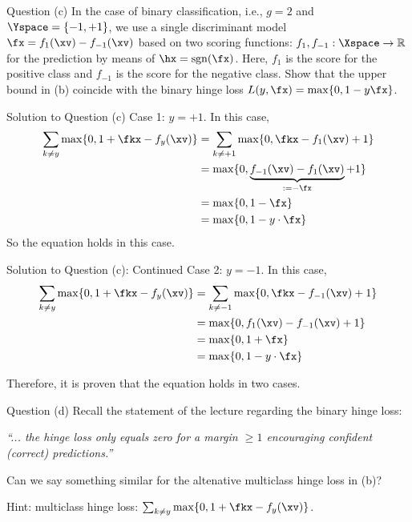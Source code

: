 \documentclass[aspectratio=169]{beamer}
\newcommand{\fyx}{f_y(\xv)}
\begin{document}
\begin{frame}{Question (c)}
	In the case of binary classification, i.e., $g=2$ and $\Yspace = \{-1, +1\}$, we use a single discriminant model $\fx = f_1(\xv) - f_{-1}(\xv)$ based on two scoring functions: $f_1, f_{-1}: \Xspace \to \mathbb{R}$ for the prediction by means of $\hx = \mathrm{sgn}(\fx)$. Here, $f_1$ is the score for the positive class and $f_{-1}$ is the score for the negative class. Show that the upper bound in (b) coincide with the binary hinge loss $L(y, \fx) = \max \{0, 1 - y \fx \}$.
\end{frame}

\begin{frame}{Solution to Question (c)}
	Case 1: $y= + 1$. In this case,
	\begin{align*}
		\sum_{k \neq y} \max \{0, 1 + \fkx - \fyx\}
		&= \sum_{k \neq + 1} \max \{ 0, \fkx - f_1(\xv) + 1 \} \\
		&= \max \{ 0, \underbrace{f_{-1}(\xv) - f_1(\xv)}_{:= - \fx} + 1 \} \\
		&= \max \{ 0, 1 - \fx \} \\
		&= \max \{ 0, 1 - y \cdot \fx \}
	\end{align*}
	So the equation holds in this case.
\end{frame}

\begin{frame}{Solution to Question (c): Continued}
	Case 2: $y = -1$. In this case,
	\begin{align*}
		\sum_{k \neq y} \max \{0, 1 + \fkx - \fyx \}
		&= \sum_{k \neq -1} \max \{ 0, \fkx - f_{-1}(\xv) + 1 \} \\
		&= \max \{ 0, f_1(\xv) - f_{-1}(\xv) + 1 \} \\
		&= \max \{0, 1 + \fx \} \\
		&= \max \{0, 1 - y\cdot \fx \}
	\end{align*}
	
Therefore, it is proven that the equation holds in two cases.
\end{frame}

\begin{frame}{Question (d)}
	Recall the statement of the lecture regarding the binary hinge loss:
	\vspace{10pt}
	
	\emph{``... the hinge loss only equals zero for a margin $\geq 1$ encouraging confident (correct) predictions.''}
	\vspace{10pt}
	
	Can we say something similar for the altenative multiclass hinge loss in (b)?
	
	Hint: multiclass hinge loss: $\sum_{k\neq y} \max \{0, 1 + \fkx - f_y(\xv) \}$.
\end{frame}
\end{document}
